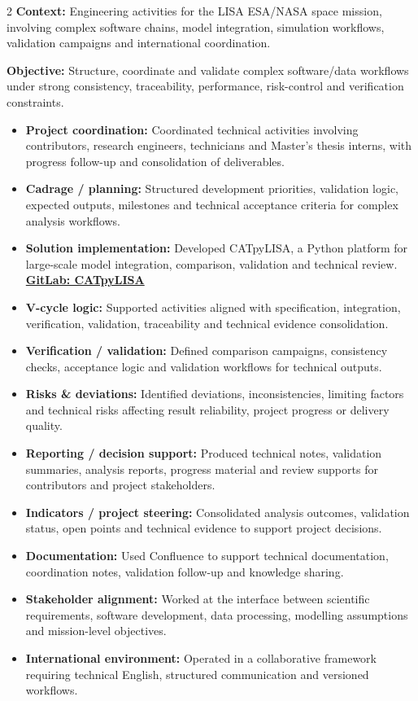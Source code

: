 \documentclass[8pt,a4paper,ragged2e,withhyper]{altacv}
\begin{document}
\begin{paracol}{2}
\textbf{Context:} Engineering activities for the LISA ESA/NASA space mission, involving complex software chains, model integration, simulation workflows, validation campaigns and international coordination.

\textbf{Objective:} Structure, coordinate and validate complex software/data workflows under strong consistency, traceability, performance, risk-control and verification constraints.

\begin{itemize}
  \item \textbf{Project coordination:} Coordinated technical activities involving contributors, research engineers, technicians and Master's thesis interns, with progress follow-up and consolidation of deliverables.
  \item \textbf{Cadrage / planning:} Structured development priorities, validation logic, expected outputs, milestones and technical acceptance criteria for complex analysis workflows.
  \item \textbf{Solution implementation:} Developed CATpyLISA, a Python platform for large-scale model integration, comparison, validation and technical review.
  \textcolor{DarkPastelRed}{\href{https://gitlab.oca.eu/gboileau/lisa_l3_tools}{\bf GitLab: CATpyLISA}}
  \item \textbf{V-cycle logic:} Supported activities aligned with specification, integration, verification, validation, traceability and technical evidence consolidation.
  \item \textbf{Verification / validation:} Defined comparison campaigns, consistency checks, acceptance logic and validation workflows for technical outputs.
  \item \textbf{Risks \& deviations:} Identified deviations, inconsistencies, limiting factors and technical risks affecting result reliability, project progress or delivery quality.
  \item \textbf{Reporting / decision support:} Produced technical notes, validation summaries, analysis reports, progress material and review supports for contributors and project stakeholders.
  \item \textbf{Indicators / project steering:} Consolidated analysis outcomes, validation status, open points and technical evidence to support project decisions.
  \item \textbf{Documentation:} Used Confluence to support technical documentation, coordination notes, validation follow-up and knowledge sharing.
  \item \textbf{Stakeholder alignment:} Worked at the interface between scientific requirements, software development, data processing, modelling assumptions and mission-level objectives.
  \item \textbf{International environment:} Operated in a collaborative framework requiring technical English, structured communication and versioned workflows.
\end{itemize}


\end{paracol}
\end{document}

